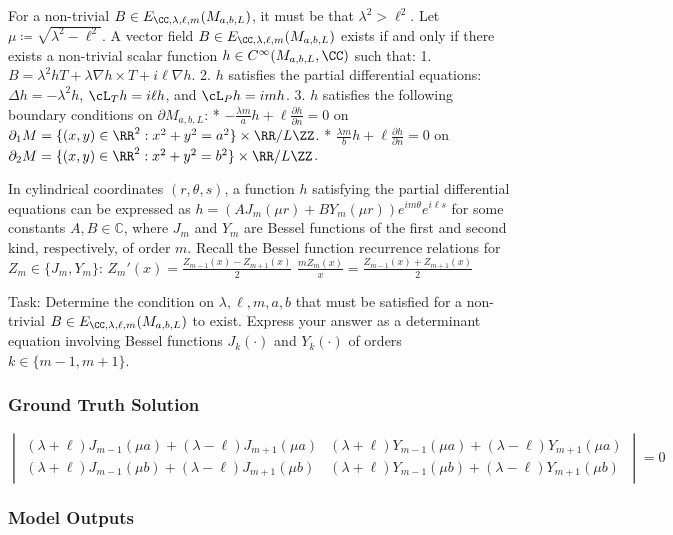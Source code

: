 \documentclass[10pt]{article}
\begin{document}
For a non-trivial $B \in E_{\CC,\lambda,\ell,m}(M_{a,b,L})$, it must be that $\lambda^2 > \ell^2$. Let $\mu \coloneqq \sqrt{\lambda^2-\ell^2}$.
A vector field $B \in E_{\CC,\lambda,\ell,m}(M_{a,b,L})$ exists if and only if there exists a non-trivial scalar function $h \in C^{\infty}(M_{a,b,L},\CC)$ such that:
1.  $B = \lambda^2 h T + \lambda \nabla h \times T + i\ell \nabla h$.
2.  $h$ satisfies the partial differential equations: $\Delta h = -\lambda^2 h$, $\cL_T h = i\ell h$, and $\cL_P h = im h$.
3.  $h$ satisfies the following boundary conditions on $\partial M_{a,b,L}$:
    *   $-\frac{\lambda m}{a} h  + \ell \frac{\partial h}{\partial n} = 0$ on $\partial_1 M = \{(x,y) \in \RR^2 : x^2+y^2 = a^2\} \times \RR/L\ZZ$.
    *   $\frac{\lambda m}{b} h + \ell \frac{\partial h}{\partial n} = 0$ on $\partial_2 M = \{(x,y) \in \RR^2 : x^2+y^2 = b^2\} \times \RR/L\ZZ$.

In cylindrical coordinates $(r,\theta,s)$, a function $h$ satisfying the partial differential equations can be expressed as $h = (A J_m(\mu r) + BY_m(\mu r))e^{im\theta}e^{i \ell s}$ for some constants $A, B \in \mathbb{C}$, where $J_m$ and $Y_m$ are Bessel functions of the first and second kind, respectively, of order $m$.
Recall the Bessel function recurrence relations for $Z_m \in \{J_m,Y_m\}$:
$Z_m'(x) = \frac{Z_{m-1}(x) - Z_{m+1}(x)}{2}$
$\frac{m Z_m(x)}{x} = \frac{Z_{m-1}(x) + Z_{m+1}(x)}{2}$

Task:
Determine the condition on $\lambda, \ell, m, a, b$ that must be satisfied for a non-trivial $B \in E_{\CC,\lambda,\ell,m}(M_{a,b,L})$ to exist. Express your answer as a determinant equation involving Bessel functions $J_k(\cdot)$ and $Y_k(\cdot)$ of orders $k \in \{m-1, m+1\}$.

\subsubsection*{Ground Truth Solution}
\[ \boxed{\begin{vmatrix}
    (\lambda+\ell) J_{m-1}(\mu a) + (\lambda-\ell) J_{m+1}(\mu a) & (\lambda+\ell) Y_{m-1}(\mu a) + (\lambda-\ell) Y_{m+1}(\mu a)\\
    (\lambda+\ell) J_{m-1}(\mu b) + (\lambda-\ell) J_{m+1}(\mu b) & (\lambda+\ell) Y_{m-1}(\mu b) + (\lambda-\ell) Y_{m+1}(\mu b)
\end{vmatrix} = 0} \]

\subsubsection*{Model Outputs}
\end{document}
